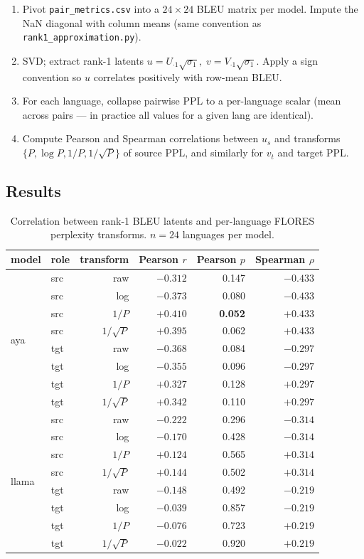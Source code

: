 \documentclass[11pt]{article}
\newcommand{\code}[1]{\texttt{\small #1}}
\begin{document}
\begin{enumerate}
  \item Pivot \code{pair\_metrics.csv} into a $24\times24$ BLEU matrix per
    model. Impute the NaN diagonal with column means (same convention as
    \code{rank1\_approximation.py}).
  \item SVD; extract rank-1 latents $u = U_{\cdot 1} \sqrt{\sigma_1},\;
    v = V_{\cdot 1} \sqrt{\sigma_1}$. Apply a sign convention so $u$
    correlates positively with row-mean BLEU.
  \item For each language, collapse pairwise PPL to a per-language scalar
    (mean across pairs --- in practice all values for a given lang are
    identical).
  \item Compute Pearson and Spearman correlations between $u_s$ and
    transforms $\{P, \log P, 1/P, 1/\sqrt{P}\}$ of source PPL, and
    similarly for $v_t$ and target PPL.
\end{enumerate}

\subsection{Results}

\begin{table}[h]
\centering
\small
\begin{tabular}{llrrrr}
\toprule
model & role & transform & Pearson $r$ & Pearson $p$ & Spearman $\rho$ \\
\midrule
\multirow{8}{*}{aya}
 & src & raw       & $-0.312$ & 0.147   & $-0.433$ \\
 & src & log       & $-0.373$ & 0.080   & $-0.433$ \\
 & src & $1/P$     & $+0.410$ & \textbf{0.052} & $+0.433$ \\
 & src & $1/\sqrt{P}$ & $+0.395$ & 0.062 & $+0.433$ \\
 & tgt & raw       & $-0.368$ & 0.084   & $-0.297$ \\
 & tgt & log       & $-0.355$ & 0.096   & $-0.297$ \\
 & tgt & $1/P$     & $+0.327$ & 0.128   & $+0.297$ \\
 & tgt & $1/\sqrt{P}$ & $+0.342$ & 0.110 & $+0.297$ \\
\midrule
\multirow{8}{*}{llama}
 & src & raw       & $-0.222$ & 0.296   & $-0.314$ \\
 & src & log       & $-0.170$ & 0.428   & $-0.314$ \\
 & src & $1/P$     & $+0.124$ & 0.565   & $+0.314$ \\
 & src & $1/\sqrt{P}$ & $+0.144$ & 0.502 & $+0.314$ \\
 & tgt & raw       & $-0.148$ & 0.492   & $-0.219$ \\
 & tgt & log       & $-0.039$ & 0.857   & $-0.219$ \\
 & tgt & $1/P$     & $-0.076$ & 0.723   & $+0.219$ \\
 & tgt & $1/\sqrt{P}$ & $-0.022$ & 0.920 & $+0.219$ \\
\bottomrule
\end{tabular}
\caption{Correlation between rank-1 BLEU latents and per-language FLORES
perplexity transforms. $n = 24$ languages per model.}
\end{table}
\end{document}
